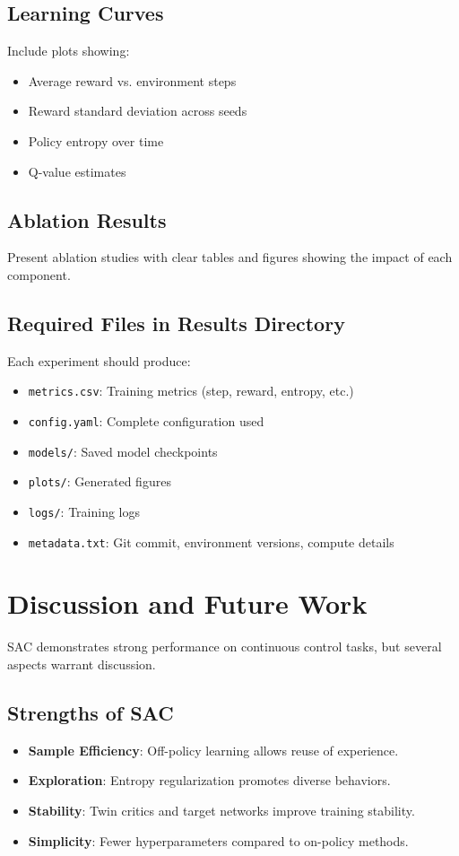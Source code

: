 \documentclass[conference]{IEEEtran}
\begin{document}
\subsection{Learning Curves}
Include plots showing:
\begin{itemize}
  \item Average reward vs. environment steps
  \item Reward standard deviation across seeds
  \item Policy entropy over time
  \item Q-value estimates
\end{itemize}

\subsection{Ablation Results}
Present ablation studies with clear tables and figures showing the impact of each component.

\subsection{Required Files in Results Directory}
Each experiment should produce:
\begin{itemize}
  \item \texttt{metrics.csv}: Training metrics (step, reward, entropy, etc.)
  \item \texttt{config.yaml}: Complete configuration used
  \item \texttt{models/}: Saved model checkpoints
  \item \texttt{plots/}: Generated figures
  \item \texttt{logs/}: Training logs
  \item \texttt{metadata.txt}: Git commit, environment versions, compute details
\end{itemize}

\section{Discussion and Future Work}
SAC demonstrates strong performance on continuous control tasks, but several aspects warrant discussion.

\subsection{Strengths of SAC}
\begin{itemize}
  \item \textbf{Sample Efficiency}: Off-policy learning allows reuse of experience.
  \item \textbf{Exploration}: Entropy regularization promotes diverse behaviors.
  \item \textbf{Stability}: Twin critics and target networks improve training stability.
  \item \textbf{Simplicity}: Fewer hyperparameters compared to on-policy methods.
\end{itemize}
\end{document}
